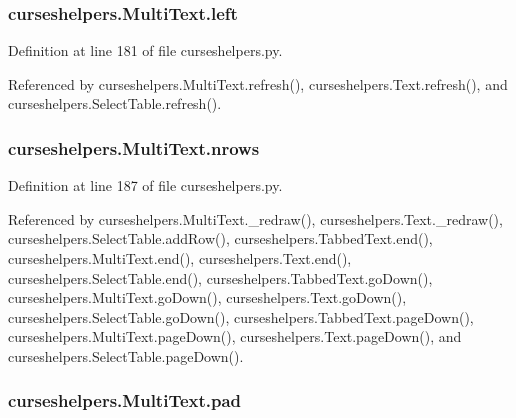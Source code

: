 \subsubsection[{left}]{\setlength{\rightskip}{0pt plus 5cm}curseshelpers.\-Multi\-Text.\-left}\label{classcurseshelpers_1_1MultiText_af9ed6395122c6150e6ed32ce116766ab}


Definition at line 181 of file curseshelpers.\-py.



Referenced by curseshelpers.\-Multi\-Text.\-refresh(), curseshelpers.\-Text.\-refresh(), and curseshelpers.\-Select\-Table.\-refresh().

\subsubsection[{nrows}]{\setlength{\rightskip}{0pt plus 5cm}curseshelpers.\-Multi\-Text.\-nrows}\label{classcurseshelpers_1_1MultiText_a49ee3d9669d20410fc5bca6ae50bb9f4}


Definition at line 187 of file curseshelpers.\-py.



Referenced by curseshelpers.\-Multi\-Text.\-\_\-redraw(), curseshelpers.\-Text.\-\_\-redraw(), curseshelpers.\-Select\-Table.\-add\-Row(), curseshelpers.\-Tabbed\-Text.\-end(), curseshelpers.\-Multi\-Text.\-end(), curseshelpers.\-Text.\-end(), curseshelpers.\-Select\-Table.\-end(), curseshelpers.\-Tabbed\-Text.\-go\-Down(), curseshelpers.\-Multi\-Text.\-go\-Down(), curseshelpers.\-Text.\-go\-Down(), curseshelpers.\-Select\-Table.\-go\-Down(), curseshelpers.\-Tabbed\-Text.\-page\-Down(), curseshelpers.\-Multi\-Text.\-page\-Down(), curseshelpers.\-Text.\-page\-Down(), and curseshelpers.\-Select\-Table.\-page\-Down().

\subsubsection[{pad}]{\setlength{\rightskip}{0pt plus 5cm}curseshelpers.\-Multi\-Text.\-pad}\label{classcurseshelpers_1_1MultiText_a1834ac23773a103bcbe5479dfb10631c}


